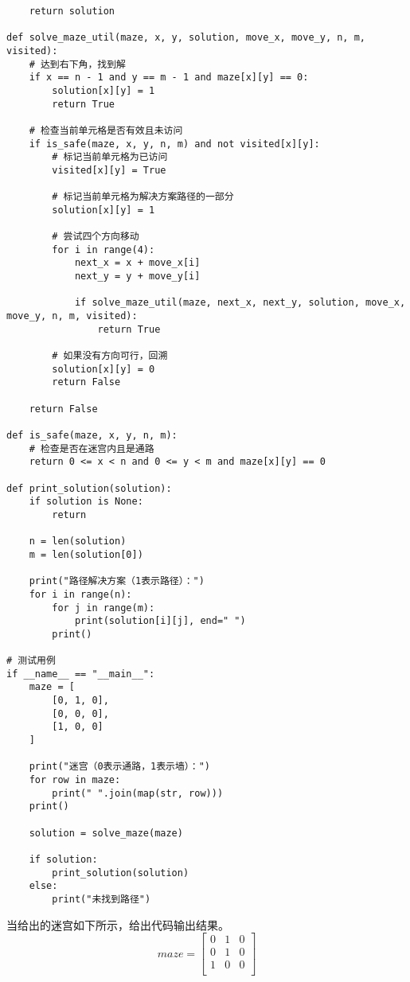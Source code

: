 \documentclass[12pt,twoside]{article}
\begin{document}
\begin{problems}
\begin{verbatim}
    return solution

def solve_maze_util(maze, x, y, solution, move_x, move_y, n, m, visited):
    # 达到右下角，找到解
    if x == n - 1 and y == m - 1 and maze[x][y] == 0:
        solution[x][y] = 1
        return True
    
    # 检查当前单元格是否有效且未访问
    if is_safe(maze, x, y, n, m) and not visited[x][y]:
        # 标记当前单元格为已访问
        visited[x][y] = True
        
        # 标记当前单元格为解决方案路径的一部分
        solution[x][y] = 1
        
        # 尝试四个方向移动
        for i in range(4):
            next_x = x + move_x[i]
            next_y = y + move_y[i]
            
            if solve_maze_util(maze, next_x, next_y, solution, move_x, move_y, n, m, visited):
                return True
        
        # 如果没有方向可行，回溯
        solution[x][y] = 0
        return False
    
    return False

def is_safe(maze, x, y, n, m):
    # 检查是否在迷宫内且是通路
    return 0 <= x < n and 0 <= y < m and maze[x][y] == 0

def print_solution(solution):
    if solution is None:
        return
    
    n = len(solution)
    m = len(solution[0])
    
    print("路径解决方案（1表示路径）：")
    for i in range(n):
        for j in range(m):
            print(solution[i][j], end=" ")
        print()

# 测试用例
if __name__ == "__main__":
    maze = [
        [0, 1, 0],
        [0, 0, 0],
        [1, 0, 0]
    ]
    
    print("迷宫（0表示通路，1表示墙）：")
    for row in maze:
        print(" ".join(map(str, row)))
    print()
    
    solution = solve_maze(maze)
    
    if solution:
        print_solution(solution)
    else:
        print("未找到路径") 
\end{verbatim}
\ppart 当给出的迷宫如下所示，给出代码输出结果。
\[
maze=
\begin{bmatrix}
   0&1 &0\\ 
   0 &1& 0 \\
   1 &0 &0 \\
\end{bmatrix} 
\]


\end{problems}
\end{document}

